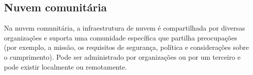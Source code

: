 \subsection{Nuvem comunitária}

Na nuvem comunitária, a infraestrutura de nuvem é compartilhada por diversas
organizações e suporta uma comunidade específica que partilha preocupações
(por exemplo, a missão, os requisitos de segurança, política e considerações sobre
o cumprimento). Pode ser administrado por organizações ou por um terceiro e pode
existir localmente ou remotamente.

